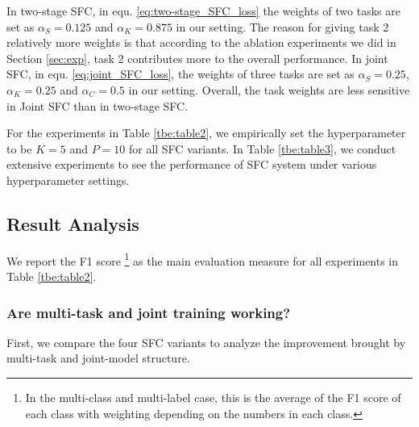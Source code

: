 In two-stage SFC, in equ. \ref{eq:two-stage_SFC_loss} the weights of two tasks
are  set  as  $\alpha_S=0.125$ and $\alpha_K=0.875$ in our setting. The reason
for  giving  task  2 relatively more weights is that according to the ablation
experiments  we  did  in Section \ref{sec:exp}, task 2 contributes more to the
overall  performance.  In  joint  SFC,  in  equ.  \ref{eq:joint_SFC_loss}, the
weights  of  three  tasks  are  set  as  $\alpha_S=0.25$,  $\alpha_K=0.25$ and
$\alpha_C=0.5$  in  our setting. Overall, the task weights are less sensitive
in Joint SFC than in two-stage SFC.

For  the  experiments  in  Table  \ref{tbe:table2},  we  empirically  set  the
hyperparameter  to  be  $K=5$  and  $P=10$  for  all  SFC  variants.  In Table
\ref{tbe:table3},  we  conduct extensive experiments to see the performance of
SFC system under various hyperparameter settings.

\subsection{Result Analysis}
We  report  the F1 score \footnote{In the multi-class and multi-label case, this
is  the  average  of  the F1 score of each class with weighting depending on the
numbers  in  each class.} as the main evaluation measure for all experiments in
Table \ref{tbe:table2}.


\subsubsection*{Are multi-task and joint training working?} 
First, we compare the four  SFC  variants to analyze the improvement
brought  by  multi-task  and  joint-model  structure. 

\begin{table}
  \begin{centering}
    \par
  \end{centering}
  \caption{The average classification accuracy in percentage in stage 1 on all five dataset.}
  \label{tbe:top1_5_accuracy}
\end{table}


